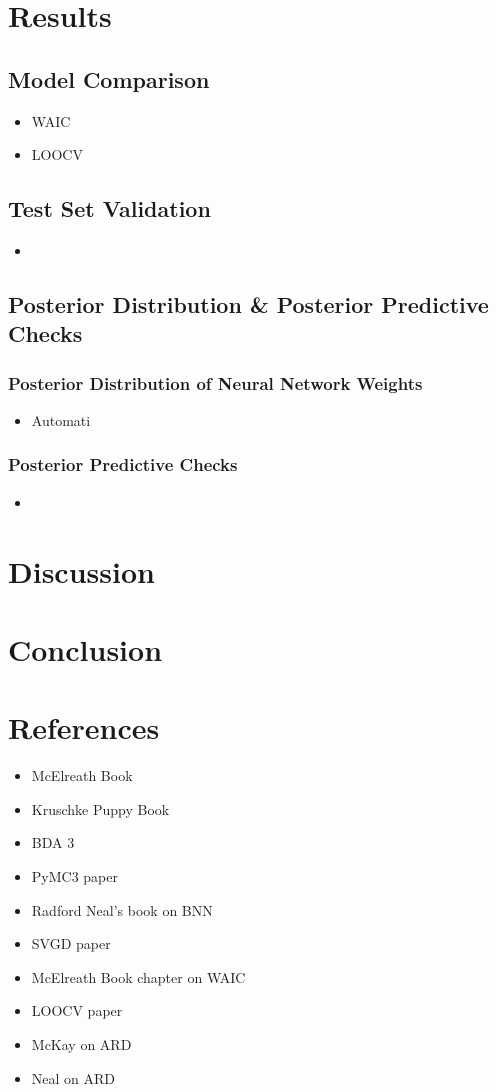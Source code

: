 \documentclass[10pt,a4paper]{article}
\begin{document}
	\section{Results}
		\subsection{Model Comparison}
			\begin{itemize}
				\item WAIC
				\item LOOCV
			\end{itemize}
		\subsection{Test Set Validation}
			\begin{itemize}
				\item 
			\end{itemize}
		\subsection{Posterior Distribution \& Posterior Predictive Checks}
			\subsubsection{Posterior Distribution of Neural Network Weights}
			\begin{itemize}
				\item Automati
			\end{itemize}
			\subsubsection{Posterior Predictive Checks}
			\begin{itemize}
				\item 
			\end{itemize}
	\newpage
	\section{Discussion}
	\newpage
	\section{Conclusion}
	\newpage
	\section{References}
		\begin{itemize}
			\item McElreath Book
			\item Kruschke Puppy Book
			\item BDA 3
			\item PyMC3 paper
			\item Radford Neal's book on BNN
			\item SVGD paper
			\item McElreath Book chapter on WAIC
			\item LOOCV paper
			\item McKay on ARD
			\item Neal on ARD
		\end{itemize}
\end{document}
